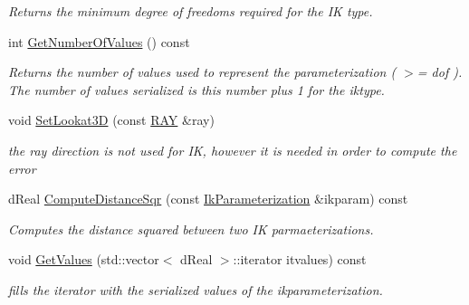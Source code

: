 \begin{DoxyCompactItemize}
\begin{DoxyCompactList}\small\item\em Returns the minimum degree of freedoms required for the IK type. \item\end{DoxyCompactList}\item 
\hypertarget{classOpenRAVE_1_1IkParameterization_ac914934393fca4ffa7cc103ac9068ece}{
int \hyperlink{classOpenRAVE_1_1IkParameterization_ac914934393fca4ffa7cc103ac9068ece}{GetNumberOfValues} () const }
\label{classOpenRAVE_1_1IkParameterization_ac914934393fca4ffa7cc103ac9068ece}

\begin{DoxyCompactList}\small\item\em Returns the number of values used to represent the parameterization ( $>$= dof ). The number of values serialized is this number plus 1 for the iktype. \item\end{DoxyCompactList}\item 
\hypertarget{classOpenRAVE_1_1IkParameterization_a935c8c5f94115fb874a0bb425515344e}{
void \hyperlink{classOpenRAVE_1_1IkParameterization_a935c8c5f94115fb874a0bb425515344e}{SetLookat3D} (const \hyperlink{classOpenRAVE_1_1geometry_1_1ray}{RAY} \&ray)}
\label{classOpenRAVE_1_1IkParameterization_a935c8c5f94115fb874a0bb425515344e}

\begin{DoxyCompactList}\small\item\em the ray direction is not used for IK, however it is needed in order to compute the error \item\end{DoxyCompactList}\item 
\hypertarget{classOpenRAVE_1_1IkParameterization_a4bfb30431b8a3d0e0b3e138ad1e826c8}{
dReal \hyperlink{classOpenRAVE_1_1IkParameterization_a4bfb30431b8a3d0e0b3e138ad1e826c8}{ComputeDistanceSqr} (const \hyperlink{classOpenRAVE_1_1IkParameterization}{IkParameterization} \&ikparam) const }
\label{classOpenRAVE_1_1IkParameterization_a4bfb30431b8a3d0e0b3e138ad1e826c8}

\begin{DoxyCompactList}\small\item\em Computes the distance squared between two IK parmaeterizations. \item\end{DoxyCompactList}\item 
void \hyperlink{classOpenRAVE_1_1IkParameterization_ab349673fdd07cae6247793bb3961f7e4}{GetValues} (std::vector$<$ dReal $>$::iterator itvalues) const 
\begin{DoxyCompactList}\small\item\em fills the iterator with the serialized values of the ikparameterization. \item\end{DoxyCompactList}\end{DoxyCompactItemize}
